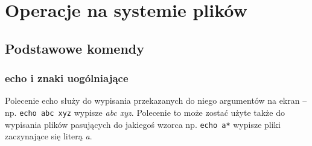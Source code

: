 % 
% 
% 
% 

\section{Operacje na systemie plików}

\subsection{Podstawowe komendy}


\subsubsection{echo i znaki uogólniające}

Polecenie echo służy do wypisania przekazanych do niego argumentów na ekran – np. \Verb$echo abc xyz$ wypisze \textit{abc xyz}.
Polecenie to może zostać użyte także do wypisania plików pasujących do jakiegoś wzorca np. \Verb$echo a*$ wypisze pliki zaczynające się literą \textit{a}.

